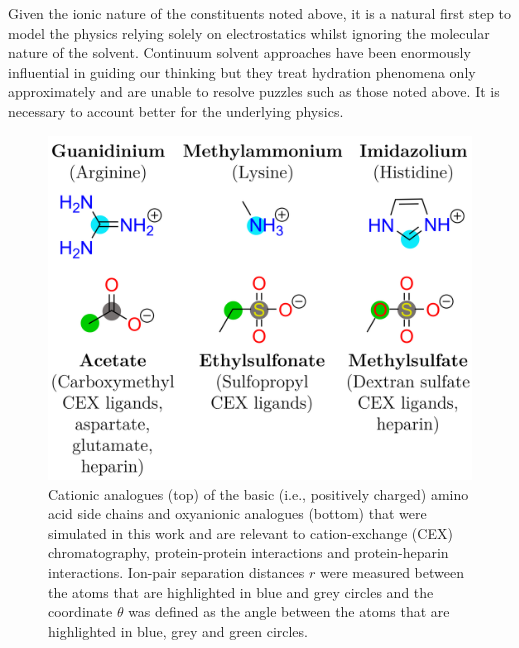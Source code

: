 \documentclass[journal=jpclcd,manuscript=article,articletitle=true,layout=twocolumn]{achemso}
\begin{document}
Given the ionic nature of the constituents noted above, it is a natural first step to model the physics relying solely on electrostatics whilst ignoring the molecular nature of the solvent. Continuum solvent approaches have been enormously influential in guiding our thinking but they treat hydration phenomena only approximately and are unable to resolve puzzles such as those noted above\cite{Warshel2006, Ren2012, Koehl2006, Gray2018, Sun2016, Asthagiri2021b, Gunsteren2006}. It is necessary to account better for the underlying physics. 

\begin{figure}[ht]
    \begin{center}
        \includegraphics[width=\columnwidth]{final_images/Figure1.png}
        \caption{Cationic analogues (top) of the basic (i.e., positively charged) amino acid side chains and oxyanionic analogues (bottom) that were simulated in this work and are relevant to cation-exchange (CEX) chromatography, protein-protein interactions and protein-heparin interactions. Ion-pair separation distances $r$ were measured between the atoms that are highlighted in blue and grey circles and the coordinate $\theta$ was defined as the angle between the atoms that are highlighted in blue, grey and green circles.} 
        \label{fig:schematic}
    \end{center}
\end{figure}
\end{document}
